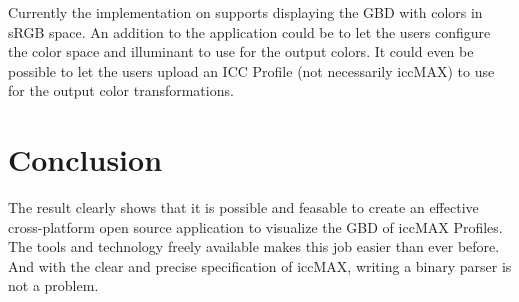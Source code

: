 Currently the implementation on supports displaying the GBD with colors in sRGB space.
An addition to the application could be to let the users configure the color space and illuminant to use for the output colors.
It could even be possible to let the users upload an ICC Profile (not necessarily iccMAX) to use for the output color transformations.

\section{Conclusion}
The result clearly shows that it is possible and feasable to create an effective cross-platform open source application to visualize the GBD of iccMAX Profiles.
The tools and technology freely available makes this job easier than ever before.
And with the clear and precise specification of iccMAX, writing a binary parser is not a problem.

